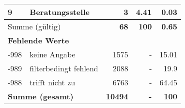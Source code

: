 \begin{longtable}{lXrrr}
     9 &
     \multicolumn{1}{X}{ Beratungsstelle   } &


       \num{3} &
       \num[round-mode=places,round-precision=2]{4.41} &
         \num[round-mode=places,round-precision=2]{0.03} \\
     \midrule
     \multicolumn{2}{l}{Summe (gültig)} &
       \textbf{\num{68}} &
     \textbf{\num{100}} &
       \textbf{\num[round-mode=places,round-precision=2]{0.65}} \\
     \multicolumn{5}{l}{\textbf{Fehlende Werte}}\\
       -998 &
       keine Angabe &
         \num{1575} &
        - &
         \num[round-mode=places,round-precision=2]{15.01} \\
       -989 &
       filterbedingt fehlend &
         \num{2088} &
        - &
         \num[round-mode=places,round-precision=2]{19.9} \\
       -988 &
       trifft nicht zu &
         \num{6763} &
        - &
         \num[round-mode=places,round-precision=2]{64.45} \\
     \midrule
     \multicolumn{2}{l}{\textbf{Summe (gesamt)}} &
          \textbf{\num{10494}} &
        \textbf{-} &
        \textbf{\num{100}} \\
     \bottomrule
     \end{longtable}
     

